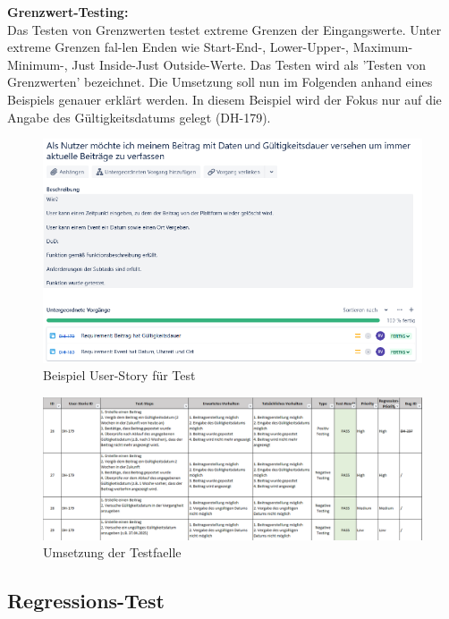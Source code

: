 \textbf{Grenzwert-Testing:} \\
Das Testen von Grenzwerten testet extreme Grenzen der Eingangswerte. Unter extreme Grenzen fal-len Enden wie Start-End-, Lower-Upper-, Maximum-Minimum-, Just Inside-Just Outside-Werte. Das Testen wird als 'Testen von Grenzwerten' bezeichnet.
Die Umsetzung soll nun im Folgenden anhand eines Beispiels genauer erklärt werden. In diesem Beispiel wird der Fokus nur auf die Angabe des Gültigkeitsdatums gelegt (DH-179).

\begin{figure}[!htb]
  \centering
  \includegraphics[width=.9\textwidth]{figures/rebecca/Beispiel_User_Story_Test.png}
  \caption[]{Beispiel User-Story für Test}
  \label{fig:BespielUserStory}
\end{figure}

\begin{figure}[!htb]
  \centering
  \includegraphics[width=.9\textwidth]{figures/rebecca/Umsetzung_Testfaelle}
  \caption[]{Umsetzung der Testfaelle}
  \label{fig:UmsetzungTestFaelle}
\end{figure}

\subsection{Regressions-Test}
\label{sub:UmsetzungTestRegression}

